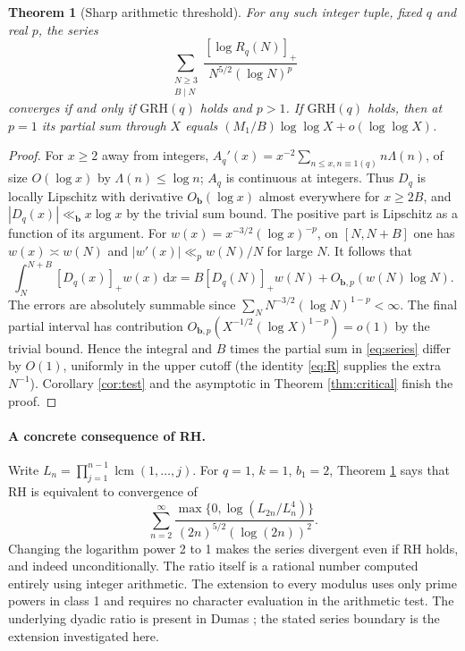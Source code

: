 \documentclass[11pt]{article}
\newtheorem{theorem}{Theorem}[section]
\newcommand{\pp}[1]{[#1]_+}
\newcommand{\dd}{\,\mathrm d}
\newcommand{\GRH}{\mathrm{GRH}}
\begin{document}
\begin{theorem}[Sharp arithmetic threshold]\label{thm:arith}
For any such integer tuple, fixed $q$ and real $p$, the series
\begin{equation}\label{eq:series}
 \sum_{\substack{N\ge3\\B\mid N}}\frac{\pp{\log R_q(N)}}{N^{5/2}(\log N)^p}
\end{equation}
converges if and only if $\GRH(q)$ holds and $p>1$. If $\GRH(q)$ holds, then at $p=1$ its partial sum through $X$ equals $(M_1/B)\log\log X+o(\log\log X)$.
\end{theorem}
\begin{proof}
For $x\ge2$ away from integers, $A_q'(x)=x^{-2}\sum_{n\le x,n\equiv1(q)}n\Lambda(n)$, of size $O(\log x)$ by $\Lambda(n)\le\log n$; $A_q$ is continuous at integers. Thus $D_q$ is locally Lipschitz with derivative $O_{\mathbf b}(\log x)$ almost everywhere for $x\ge2B$, and $|D_q(x)|\ll_{\mathbf b}x\log x$ by the trivial sum bound. The positive part is Lipschitz as a function of its argument. For $w(x)=x^{-3/2}(\log x)^{-p}$, on $[N,N+B]$ one has $w(x)\asymp w(N)$ and $|w'(x)|\ll_p w(N)/N$ for large $N$. It follows that
\[
 \int_N^{N+B}\pp{D_q(x)}w(x)\dd x
 =B\pp{D_q(N)}w(N)+O_{\mathbf b,p}(w(N)\log N).
\]
The errors are absolutely summable since $\sum_N N^{-3/2}(\log N)^{1-p}<\infty$. The final partial interval has contribution $O_{\mathbf b,p}(X^{-1/2}(\log X)^{1-p})=o(1)$ by the trivial bound. Hence the integral and $B$ times the partial sum in \eqref{eq:series} differ by $O(1)$, uniformly in the upper cutoff (the identity \eqref{eq:R} supplies the extra $N^{-1}$). Corollary \ref{cor:test} and the asymptotic in Theorem \ref{thm:critical} finish the proof.
\end{proof}

\paragraph{A concrete consequence of RH.} Write $L_n=\prod_{j=1}^{n-1}\operatorname{lcm}(1,\ldots,j)$. For $q=1$, $k=1$, $b_1=2$, Theorem \ref{thm:arith} says that RH is equivalent to convergence of
\[
 \sum_{n=2}^{\infty}\frac{\max\{0,\log(L_{2n}/L_n^4)\}}{(2n)^{5/2}(\log(2n))^2}.
\]
Changing the logarithm power 2 to 1 makes the series divergent even if RH holds, and indeed unconditionally. The ratio itself is a rational number computed entirely using integer arithmetic. The extension to every modulus uses only prime powers in class 1 and requires no character evaluation in the arithmetic test. The underlying dyadic ratio is present in Dumas \cite{dumas}; the stated series boundary is the extension investigated here.
\end{document}

